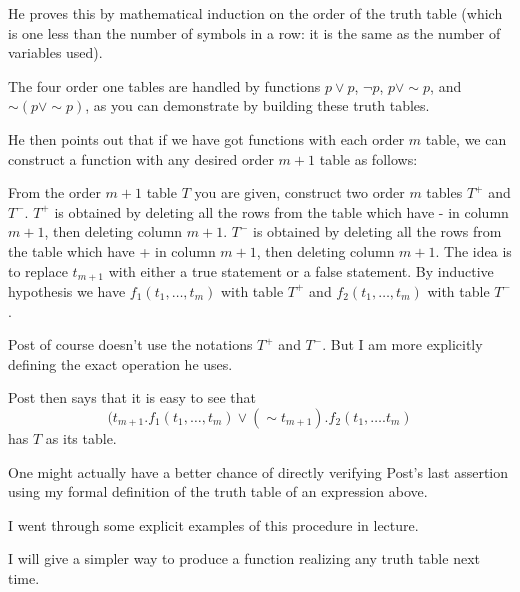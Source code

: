 \documentclass[12pt]{article}
\begin{document}
He proves this by mathematical induction on the order of the truth table (which is one less than the number of symbols in a row:  it is the same as the number of variables used).

The four order one tables are handled by functions $p \vee p$, $\neg p$, $p \vee \sim p$, and $\sim(p \vee \sim p)$, as you can demonstrate by building these truth tables.

He then points out that if we have got functions with each order $m$ table, we can construct a function with any desired order $m+1$ table as follows:

From the order $m+1$ table $T$ you are given, construct two order $m$ tables $T^+$ and $T^-$.  $T^+$ is obtained by deleting all the rows from the table which have
- in column $m+1$, then deleting column $m+1$.  $T^-$ is obtained by deleting all the rows from the table which have
+ in column $m+1$, then deleting column $m+1$.   The idea is to replace $t_{m+1}$ with either a true statement or a false statement.
By inductive hypothesis we have $f_1(t_1,\ldots,t_m)$ with table $T^+$ and $f_2(t_1,\ldots,t_m)$ with table $T^-$.

Post of course doesn't use the notations $T^+$ and $T^-$.  But I am more explicitly defining the exact operation he uses.

Post then says that it is easy to see that $$(t_{m+1}.f_1(t_1,\ldots,t_m) \vee (\sim t_{m+1}).f_2(t_1,\ldots.t_m)$$ has $T$ as its table.

One might actually have a better chance of directly verifying Post's last assertion using my formal definition of the truth table of an expression above.

I went through some explicit examples of this procedure in lecture.

I will give a simpler way to produce a function realizing any truth table next time.
\end{document}
